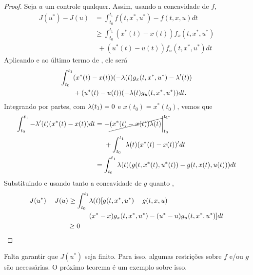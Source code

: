 \begin{proof}
    Seja $u$ um controle qualquer. Assim, usando a concavidade de $f$,
    \begin{equation}
        \label{eq:first-result}
        \begin{split}
            J(u^*) - J(u) &= \int_{t_0}^{t_1} f(t, x^*, u^*) - f(t,x,u) dt \\
            &\ge \int_{t_0}^{t_1} (x^{*}(t) - x(t))f_x(t, x^*, u^*) \\ 
            &~~+ (u^*(t) - u(t))f_u(t, x^*, u^*)dt
        \end{split}
    \end{equation}
    Aplicando  e  ao último termo de
    , ele será 
    \begin{equation*}
        \begin{split}
            \int_{t_0}^{t_1} &(x^{*}(t) - x(t))(-\lambda(t)g_x(t,x^*, u^*) - \lambda '(t)) \\ 
            &+ (u^*(t) - u(t))(-\lambda(t)g_u(t,x^*, u^*))dt.
        \end{split}
    \end{equation*}
    Integrando por partes, com $\lambda(t_1) = 0$ e $x(t_0) = x^*(t_0)$, vemos que
    \begin{equation*}
        \begin{split}
            \int_{t_0}^{t_1} -\lambda '(t)(x^*(t) - x(t))dt &= -\cancel{(x^*(t) - x(t))\lambda(t)\bigg\rvert_{t_0}^{t_1}} \\ 
            &~~~~+ \int_{t_0}^{t_1}\lambda(t)(x^*(t) - x(t))'dt \\
            &= \int_{t_0}^{t_1}\lambda(t)(g(t,x^*(t),u^*(t)) - g(t,x(t),u(t)))dt
        \end{split}
    \end{equation*}
    Substituindo e usando tanto a concavidade de $g$ quanto ,
    \begin{equation*}
        \begin{split}
            J(u^*) - J(u) \ge \int_{t_0}^{t_1} &\lambda(t)[g(t, x^*, u^*) - g(t,x,u) - \\
            &(x^* - x)g_x(t,x^*, u^*) - (u^* - u)g_u(t, x^*, u^*)]dt \\
            \ge 0 ~~~~&
        \end{split}
    \end{equation*}
\end{proof}

Falta garantir que $J(u^*)$ seja finito. Para isso, algumas restrições sobre
$f$ e/ou $g$ são necessárias. O próximo teorema é um exemplo sobre isso. 

